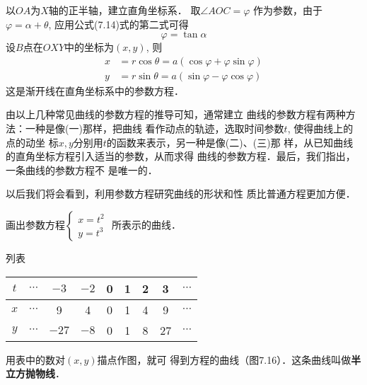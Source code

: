 以$OA$为$X$轴的正半轴，建立直角坐标系．
取$\angle AOC=\varphi$ 作为参数，由于
$\varphi =\alpha+\theta$, 
应用公式(7.14)式的第二式可得
$$\varphi  =\tan\alpha$$
设$B$点在$OXY$中的坐标为$(x,y)$, 则
\begin{equation}
\begin{split}
    x&=r\cos\theta=a(\cos\varphi+\varphi\sin\varphi)\\
    y&=r\sin\theta=a(\sin\varphi-\varphi\cos\varphi)
\end{split}
\end{equation}
这是渐开线在直角坐标系中的参数方程．

由以上几种常见曲线的参数方程的推导可知，通常建立
曲线的参数方程有两种方法：一种是像(一)那样，把曲线
看作动点的轨迹，选取时间参数$t$, 使得曲线上的点的动坐
标$x,y$分别用$t$的函数来表示，另一种是像(二)、(三)那
样，从已知曲线的直角坐标方程引入适当的参数，从而求得
曲线的参数方程．最后，我们指出，一条曲线的参数方程不
是唯一的．

以后我们将会看到，利用参数方程研究曲线的形状和性
质比普通方程更加方便．

\begin{example}
    画出参数方程$\begin{cases}
        x=t^2\\ y=t^3
    \end{cases}$
    所表示的曲线．
\end{example}


\begin{solution}
列表
\begin{center}
\begin{tabular}{ccccccccc}
\hline
$t$&$\cdots$ &$-3$ &$-2$&0&1&2&3&$\cdots$\\
\hline
$x$&$\cdots$ & 9&4&0&1&4&9             &$\cdots$ \\
$y$&$\cdots$ & $-27$&$-8$ &0&1&8&27  &$\cdots$ \\
\hline
\end{tabular}
\end{center}

用表中的数对$(x,y)$描点作图，就可
得到方程的曲线（图7.16）．这条曲线叫做\textbf{半立方抛物线}．

\begin{figure}[htp]
    \centering
{}
    \caption{}
\end{figure}

\end{solution}

